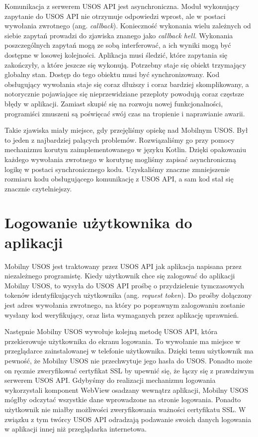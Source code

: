 \documentclass{pracamgr}
\begin{document}
Komunikacja z serwerem USOS API jest asynchroniczna. Moduł wykonujący zapytanie
do USOS API nie otrzymuje odpowiedzi wprost, ale w postaci wywołania zwrotnego
(ang. \textit{callback}). Konieczność wykonania wielu zależnych od siebie zapytań
prowadzi do zjawiska znanego jako \textit{callback hell}. Wykonania poszczególnych
zapytań mogą ze sobą interferować, a ich wyniki mogą być dostępne w losowej kolejności.
Aplikacja musi śledzić, które zapytania się zakończyły, a które jeszcze się wykonują.
Potrzebny staje się obiekt trzymający globalny stan. Dostęp do tego obiektu musi
być synchronizowany. Kod obsługujący wywołania staje się coraz dłuższy i coraz
bardziej skomplikowany, a notorycznie pojawiające się nieprzewidziane przeploty
powodują coraz częstsze błędy w aplikacji. Zamiast skupić się na rozwoju nowej
funkcjonalności, programiści zmuszeni są poświęcać swój czas na tropienie i
naprawianie awarii.

Takie zjawiska miały miejsce, gdy przejęliśmy opiekę nad Mobilnym USOS. Był to
jeden z najbardziej palących problemów. Rozwiązaliśmy go przy pomocy mechanizmu
korutyn zaimplementowanego w języku Kotlin. Dzięki opakowaniu każdego wywołania
zwrotnego w korutynę mogliśmy zapisać asynchroniczną logikę w postaci synchronicznego
kodu. Uzyskaliśmy znaczne zmniejszenie rozmiaru kodu obsługującego komunikację z
USOS API, a sam kod stał się znacznie czytelniejszy.

\section{Logowanie użytkownika do aplikacji}

Mobilny USOS jest traktowany przez USOS API jak aplikacja napisana przez niezależnego
programistę. Kiedy użytkownik chce się zalogować do aplikacji Mobilny USOS, to wysyła
do USOS API prośbę o przydzielenie tymczasowych tokenów identyfikujących użytkownika
(ang. \textit{request token}). Do prośby dołączony jest adres wywołania zwrotnego,
na który po poprawnym zalogowaniu zostanie wysłany kod weryfikujący, oraz lista
wymaganych przez aplikację uprawnień.

Następnie Mobilny USOS wywołuje kolejną metodę USOS API, która przekierowuje
użytkownika do ekranu logowania. To wywołanie ma miejsce w przeglądarce zainstalowanej
w telefonie użytkownika. Dzięki temu użytkownik ma pewność, że Mobilny USOS nie
przechwytuje jego hasła do USOS. Ponadto może on ręcznie zweryfikować certyfikat SSL
by upewnić się, że łączy się z prawdziwym serwerem USOS API. Gdybyśmy do realizacji
mechanizmu logowania wykorzystali komponent WebView osadzany wewnątrz aplikacji,
Mobilny USOS mógłby odczytać wszystkie dane wprowadzone na stronie logowania.
Ponadto użytkownik nie miałby możliwości zweryfikowania ważności certyfikatu SSL.
W związku z tym twórcy USOS API odradzają podawanie swoich danych logowania w
aplikacji innej niż przeglądarka internetowa.
\end{document}
